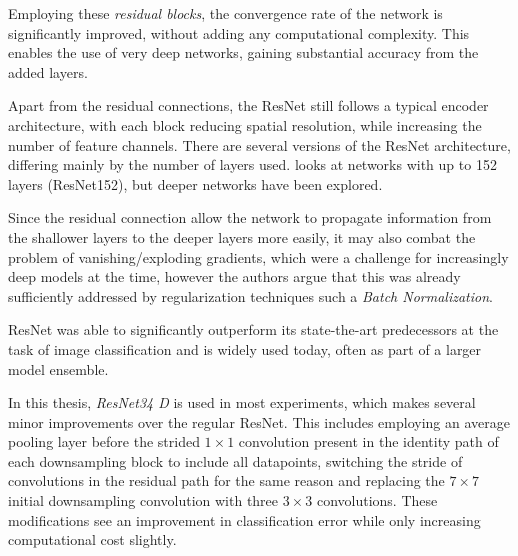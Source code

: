 Employing these \emph{residual blocks}, the convergence rate of the network is significantly improved, without adding any computational complexity. 
This enables the use of very deep networks, gaining substantial accuracy from the added layers.

Apart from the residual connections, the ResNet still follows a typical encoder architecture, with each block reducing spatial resolution, while increasing the number of feature channels.
There are several versions of the ResNet architecture, differing mainly by the number of layers used. 
 looks at networks with up to 152 layers (ResNet152), but deeper networks have been explored. 

Since the residual connection allow the network to propagate information from the shallower layers to the deeper layers more easily, it may also combat the problem of vanishing/exploding gradients, which were a challenge for increasingly deep models at the time, however the authors argue that this was already sufficiently addressed by regularization techniques such a \emph{Batch Normalization}. \cite{ioffeBatchNormalizationAccelerating2015}

ResNet was able to significantly outperform its state-the-art predecessors at the task of image classification and is widely used today, often as part of a larger model ensemble.

In this thesis, \emph{ResNet34 D} is used in most experiments, which makes several minor improvements over the regular ResNet.
This includes employing an average pooling layer before the strided $1\times 1$ convolution present in the identity path of each downsampling block to include all datapoints, switching the stride of convolutions in the residual path for the same reason and replacing the $7\times 7$ initial downsampling convolution with three $3\times 3$ convolutions.
These modifications see an improvement in classification error while only increasing computational cost slightly. \cite{heBagTricksImage2018} 

